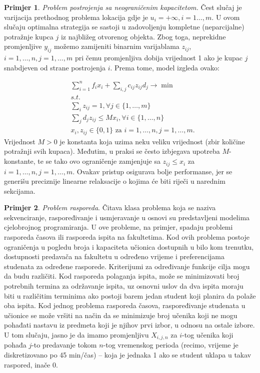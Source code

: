 \documentclass[a4paper, utf8, 11pt, colorlinks]{book}
\theoremstyle{definition}
\newtheorem{primjer}{Primjer}[chapter]
\begin{document}
\begin{primjer}
	
\emph{Problem postrojenja sa neograničenim kapacitetom.}
Čest slučaj je varijacija prethodnog problema lokacija gdje je $ u_{i} = + \infty,i=1\ldots,m$. U ovom slučaju optimalna strategija se sastoji u zadovoljenju kompletne (neparcijalne) potražnje kupca $j$ iz najbližeg otvorenog objekta. Zbog toga, neprekidne promjenljive  $y_{ij}$ možemo zamijeniti binarnim varijablama $z_{ij}$, $i=1,\ldots,n, j=1,\ldots,m$ pri čemu promjenljiva dobija vrijednost 1 ako je kupac $j$ snabdjeven od strane postrojenja $i$. Prema tome, model izgleda ovako:

\begin{align*}
	&\sum_{i=1}^n f_i x_i  + \sum_{i,j} c_{ij} z_{ij} d_j \rightarrow \min\\
	& s.t. \nonumber \\
	& \sum_{i} z_{ij} = 1, \forall j\in\{1,\ldots,m\} \\
	& \sum_{j} d_j z_{ij} \leq M x_i, \forall i \in \{1,\ldots,n\} \\
	& x_i, z_{ij} \in \{0,1\} \mbox{ za } i = 1, \ldots, n, j = 1,  \ldots, m.
\end{align*}
Vrijednost $M>0$ je konstanta koja uzima neku veliku vrijednost (zbir količine potražnji svih kupaca). Međutim, u praksi se često izbjegava upotreba $M$-konstante, te se tako ovo ograničenje zamjenjuje sa $ z_{ij} \leq x_i$ 
za $ i = 1, \ldots, n, j = 1,  \ldots, m$. Ovakav pristup osigurava bolje performanse, jer se generišu preciznije linearne relaksacije o kojima će biti riječi u narednim sekcijama.
\end{primjer}
\begin{primjer}
\emph{Problem rasporeda}. Čitava klasa problema koja se naziva sekvenciranje, raspoređivanje i usmjeravanje u osnovi su predstavljeni modelima cjelobrojnog programiranja. U ove probleme, na primjer, spadaju problemi rasporeda časova ili rasporeda ispita na fakultetima. Kod ovih problema postoje ograničenja u pogledu broja i kapaciteta učionica dostupnih u bilo kom trenutku, dostupnosti predavača na fakultetu u određeno vrijeme i preferencijama studenata za određene rasporede. Kriterijumi za određivanje funkcije cilja mogu da budu različiti. Kod rasporeda polaganja ispita, može se minimizovati broj potrebnih termina za održavanje ispita, uz osnovni uslov da dva ispita moraju biti u različitim terminima ako postoji barem jedan student koji planira da polaže oba ispita.  Kod jednog problema rasporeda časova, raspoređivanje studenata u  učionice se može vršiti na  način da se minimizuje broj učenika koji ne mogu pohađati nastavu iz predmeta koji je njihov prvi izbor, u odnosu na ostale izbore.
 U tom slučaju, jasno je da imamo promjenljivu $X_{i,j,n}$ za   $i$-tog učenika 
koji pohađa $j$-to predavanje tokom $n$-tog vremenskog perioda (recimo, vrijeme je diskretizovano po 45 min/čas) -- koja je jednaka 1 ako se student uklapa u takav raspored, inače 0. 
\end{primjer}
\end{document}
